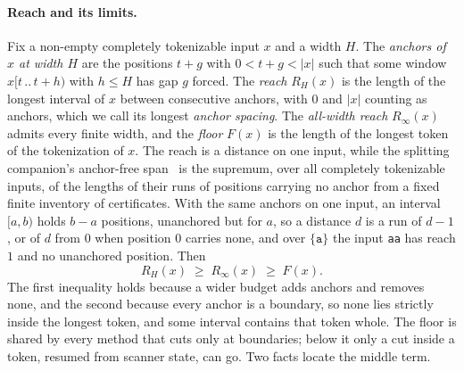 \documentclass[11pt,a4paper]{article}
\theoremstyle{definition}
\theoremstyle{plain}
\newcommand{\code}[1]{\texttt{#1}}
\begin{document}
\paragraph{Reach and its limits.} Fix a non-empty completely tokenizable input $x$ and a width $H$. The
\emph{anchors of $x$ at width $H$} are the positions $t + g$ with $0 < t + g < |x|$ such that some window
$x[t \,..\, t + h)$ with $h \leq H$ has gap $g$ forced. The \emph{reach} $R_H(x)$ is the length of the longest interval
of $x$ between consecutive anchors, with $0$ and $|x|$ counting as anchors, which we call its longest
\emph{anchor spacing}. The \emph{all-width reach} $R_\infty(x)$ admits every finite width, and the \emph{floor} $F(x)$
is the length of the longest token of the tokenization of $x$. The reach is a distance on one input, while the splitting
companion's anchor-free span~\cite{nidhogg2026splitting} is the supremum, over all completely tokenizable inputs, of the
lengths of their runs of positions carrying no anchor from a fixed finite inventory of certificates. With the same
anchors on one input, an interval $[a, b)$ holds $b - a$ positions, unanchored but for $a$, so a distance $d$ is a run
of $d - 1$, or of $d$ from $0$ when position $0$ carries none, and over $\{\code{a}\}$ the input \code{aa} has reach $1$
and no unanchored position. Then
\[ R_H(x) \;\geq\; R_\infty(x) \;\geq\; F(x). \]
The first inequality holds because a wider budget adds anchors and removes none, and the second because every anchor is
a boundary, so none lies strictly inside the longest token, and some interval contains that token whole. The floor is
shared by every method that cuts only at boundaries; below it only a cut inside a token, resumed from scanner state, can
go. Two facts locate the middle term.
\end{document}
